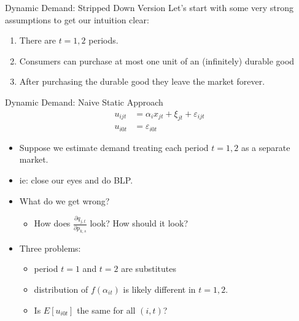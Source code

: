 %




\begin{frame}{Dynamic Demand: Stripped Down Version}
Let's start with some very strong assumptions to get our intuition clear:
\begin{enumerate}
\item There are $t=1,2$ periods.
\item Consumers can purchase at most one unit of an (infinitely) durable good
\item After purchasing the durable good they leave the market forever.
\end{enumerate}
\end{frame}

\begin{frame}{Dynamic Demand: Naive Static Approach}
\begin{align*}
u_{ijt} &=   \alpha_i x_{jt}  +  \xi_{jt} + \varepsilon_{ijt}\\
u_{i0t} &=  \varepsilon_{i0t} 
\end{align*}
\begin{itemize}
\item Suppose  we estimate demand treating each period $t=1,2$ as a \alert{separate market}.
\item ie: close our eyes and do BLP.
\item What do we get wrong?
\begin{itemize}
\item How does $\frac{\partial q_{j,t}}{\partial p_{k,s}}$ look? How should it look?
\end{itemize}
\item Three problems: 
\begin{itemize}
\item period $t=1$ and $t=2$ are \alert{substitutes}
\item distribution of $f(\alpha_{it})$ is likely different in $t=1,2$.
\item Is $E[u_{i0t}]$ the same for all $(i,t)$?
\end{itemize}
\end{itemize}
\end{frame}




